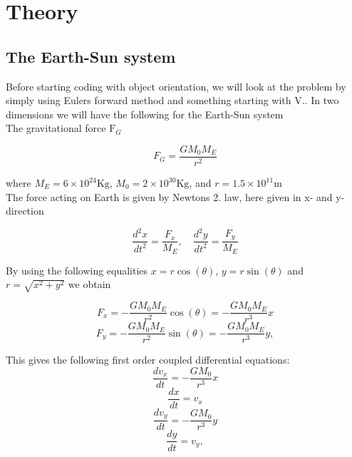 \documentclass[../main.tex]{subfiles}
\begin{document}
\section{Theory}\label{theory}
\subsection{The Earth-Sun system}
Before starting coding with object orientation, we will look at the problem by simply using Eulers forward method and something starting with V..
In two dimensions we will have the following for the Earth-Sun system \\

The gravitational force  $\text{F}_G$

\begin{equation}
  F_G= \frac{GM_0M_E}{r^2}
\end{equation}

where $M_E = 6\times 10^{24}\text{Kg}$,  $ M_0 = 2\times 10^{30}\text{Kg}$, and  $r = 1.5\times 10^{11}\text{m}$\\ The force acting on Earth is given by Newtons 2. law, here given in x- and y- direction

$$ \frac{d^2x}{dt^2} = \frac{F_x}{M_E}, \quad \frac{d^2y}{dt^2} = \frac{F_y}{M_E}$$

By using the following equalities $x = r \cos(\theta)$,  $y = r\sin(\theta)$ and $r = \sqrt{x^2 +y^2}$ we obtain

\begin{equation}
  F_x = - \frac{GM_0M_E}{r^2} \cos(\theta) =- \frac{GM_0M_E}{r^3}x
\end{equation}
\begin{equation}
  F_y = - \frac{GM_0M_E}{r^2}\sin(\theta) =- \frac{GM_0M_E}{r^3}y,
\end{equation}

This gives the following first order  coupled differential equations:
\begin{equation}
  \frac{dv_x}{dt} = - \frac{GM_0}{r^3}x
\end{equation}
\begin{equation}
  \frac{dx}{dt} = v_x
\end{equation}
\begin{equation}
  \frac{dv_y}{dt} = - \frac{GM_0}{r^3}y
\end{equation}
\begin{equation}
  \frac{dy}{dt} = v_y,
\end{equation}
\end{document}
